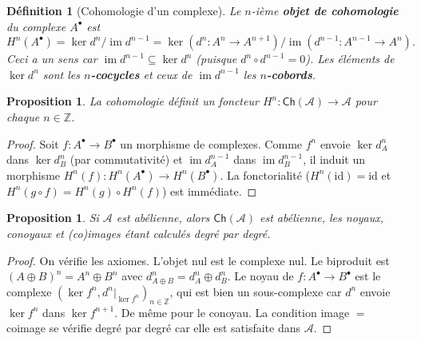\documentclass[a4paper,12pt]{book}
\DeclareMathOperator{\im}{im}
\newcommand{\id}{\mathrm{id}}
\newcommand{\Z}{\mathbb{Z}}
\newtheorem{proposition}[theoreme]{Proposition}
\newtheorem{definition}[theoreme]{Définition}
\begin{document}
\begin{definition}[Cohomologie d'un complexe]\label{def:cohomology}
Le $n$-ième \textbf{objet de cohomologie}
du complexe $A^\bullet$ est
\[
  H^n(A^\bullet) = \ker d^n / \im d^{n-1}
  = \ker(d^n \colon A^n \to A^{n+1}) \big/ \im(d^{n-1} \colon A^{n-1} \to A^n).
\]
Ceci a un sens car $\im d^{n-1} \subseteq \ker d^n$ (puisque $d^n \circ d^{n-1} = 0$).
Les éléments de $\ker d^n$ sont les \textbf{$n$-cocycles}
et ceux de $\im d^{n-1}$ les \textbf{$n$-cobords}.
\end{definition}

\begin{proposition}\label{prop:cohomology-functor}
La cohomologie définit un foncteur
$H^n \colon \mathsf{Ch}(\mathcal{A}) \to \mathcal{A}$
pour chaque $n \in \Z$.
\end{proposition}

\begin{proof}
Soit $f \colon A^\bullet \to B^\bullet$ un morphisme de complexes.
Comme $f^n$ envoie $\ker d_A^n$ dans $\ker d_B^n$ (par commutativité)
et $\im d_A^{n-1}$ dans $\im d_B^{n-1}$, il induit un morphisme
$H^n(f) \colon H^n(A^\bullet) \to H^n(B^\bullet)$. La fonctorialité
($H^n(\id) = \id$ et $H^n(g \circ f) = H^n(g) \circ H^n(f)$) est
immédiate.
\end{proof}

\begin{proposition}\label{prop:Ch-abelian}
Si $\mathcal{A}$ est abélienne, alors $\mathsf{Ch}(\mathcal{A})$ est
abélienne, les noyaux, conoyaux et (co)images étant calculés degré
par degré.
\end{proposition}

\begin{proof}
On vérifie les axiomes. L'objet nul est le complexe nul.
Le biproduit est $(A \oplus B)^n = A^n \oplus B^n$ avec
$d_{A \oplus B}^n = d_A^n \oplus d_B^n$.
Le noyau de $f \colon A^\bullet \to B^\bullet$ est le complexe
$(\ker f^n, d^n|_{\ker f^n})_{n \in \Z}$, qui est bien un sous-complexe
car $d^n$ envoie $\ker f^n$ dans $\ker f^{n+1}$. De même pour le
conoyau. La condition image $=$ coimage se vérifie degré par degré
car elle est satisfaite dans $\mathcal{A}$.
\end{proof}


\end{document}
